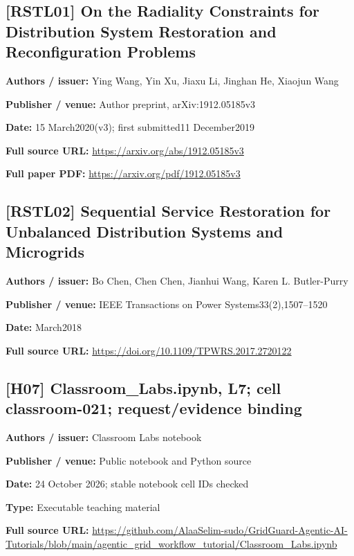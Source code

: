 \documentclass[10pt,letterpaper]{article}
\begin{document}
\subsection*{[RSTL01] On the Radiality Constraints for Distribution System Restoration and Reconfiguration Problems}
\textbf{Authors / issuer:} Ying Wang, Yin Xu, Jiaxu Li, Jinghan He, Xiaojun Wang\par
\textbf{Publisher / venue:} Author preprint, arXiv:1912.05185v3\par
\textbf{Date:} 15 March2020(v3); first submitted11 December2019\par
\textbf{Full source URL:} \href{https://arxiv.org/abs/1912.05185v3}{\small\ttfamily https:/\allowbreak{}/\allowbreak{}arxiv.\allowbreak{}org/\allowbreak{}abs/\allowbreak{}1912.\allowbreak{}05185v3}\par
\textbf{Full paper PDF:} \href{https://arxiv.org/pdf/1912.05185v3}{\small\ttfamily https:/\allowbreak{}/\allowbreak{}arxiv.\allowbreak{}org/\allowbreak{}pdf/\allowbreak{}1912.\allowbreak{}05185v3}\par
\par\medskip
\subsection*{[RSTL02] Sequential Service Restoration for Unbalanced Distribution Systems and Microgrids}
\textbf{Authors / issuer:} Bo Chen, Chen Chen, Jianhui Wang, Karen L. Butler-Purry\par
\textbf{Publisher / venue:} IEEE Transactions on Power Systems33(2),1507--1520\par
\textbf{Date:} March2018\par
\textbf{Full source URL:} \href{https://doi.org/10.1109/TPWRS.2017.2720122}{\small\ttfamily https:/\allowbreak{}/\allowbreak{}doi.\allowbreak{}org/\allowbreak{}10.\allowbreak{}1109/\allowbreak{}TPWRS.\allowbreak{}2017.\allowbreak{}2720122}\par
\par\medskip
\subsection*{[H07] Classroom\_Labs.ipynb, L7; cell classroom-021; request/evidence binding}
\textbf{Authors / issuer:} Classroom Labs notebook\par
\textbf{Publisher / venue:} Public notebook and Python source\par
\textbf{Date:} 24 October 2026; stable notebook cell IDs checked\par
\textbf{Type:} Executable teaching material\par
\textbf{Full source URL:} \href{https://github.com/AlaaSelim-sudo/GridGuard-Agentic-AI-Tutorials/blob/main/agentic_grid_workflow_tutorial/Classroom_Labs.ipynb}{\small\ttfamily https:/\allowbreak{}/\allowbreak{}github.\allowbreak{}com/\allowbreak{}AlaaSelim-\allowbreak{}sudo/\allowbreak{}GridGuard-\allowbreak{}Agentic-\allowbreak{}AI-\allowbreak{}Tutorials/\allowbreak{}blob/\allowbreak{}main/\allowbreak{}agentic\_\allowbreak{}grid\_\allowbreak{}workflow\_\allowbreak{}tutorial/\allowbreak{}Classroom\_\allowbreak{}Labs.\allowbreak{}ipynb}\par
\par\medskip
\end{document}
